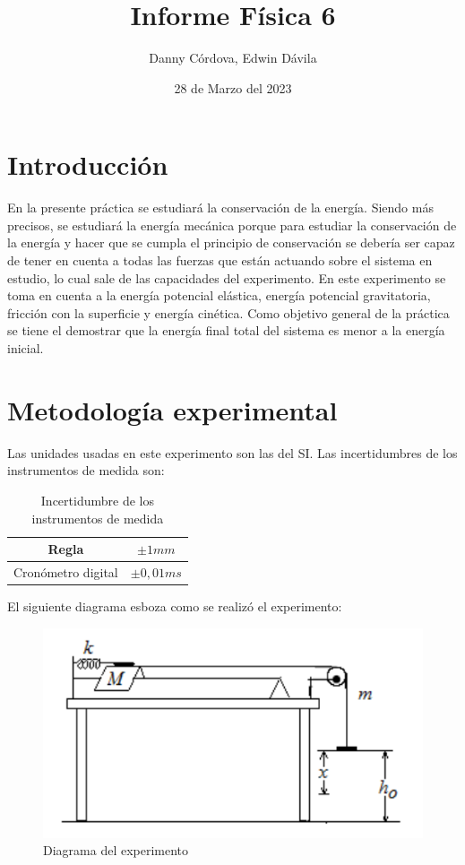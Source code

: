 \documentclass[a4paper]{article}
\title{Informe Física 6}
\author{Danny Córdova, Edwin Dávila}
\date{28 de Marzo del 2023}
\begin{document}
\maketitle

\section{Introducción}

En la presente práctica se estudiará la conservación de la energía. Siendo más precisos, se estudiará la energía mecánica porque para estudiar la conservación de la energía y hacer que se cumpla el principio de conservación se debería ser capaz de tener en cuenta a todas las fuerzas que están actuando sobre el sistema en estudio, lo cual sale de las capacidades del experimento. En este experimento se toma en cuenta a la energía potencial elástica, energía potencial gravitatoria, fricción con la superficie y energía cinética. Como objetivo general de la práctica se tiene el demostrar que la energía final total del sistema es menor a la energía inicial.

\section{Metodología experimental}
Las unidades usadas en este experimento son las del SI. Las incertidumbres de los instrumentos de medida son:

\begin{table}[H]
    \centering
    \begin{tabular}{|c|c|}
    \hline
        Regla  & $\pm 1 mm$ \\ \hline
        Cronómetro digital  & $\pm 0,01 ms$ \\ \hline
    \end{tabular}
    \caption{Incertidumbre de los instrumentos de medida}
    \label{Incertidumbre de los instrumentos de medida}
\end{table}

El siguiente diagrama esboza como se realizó el experimento:
\begin{figure} [H]
    \centering
    \includegraphics{Diagrama Lab 6.png}
    \caption{Diagrama del experimento}
    \label{fig:my_label}
\end{figure}
\end{document}
